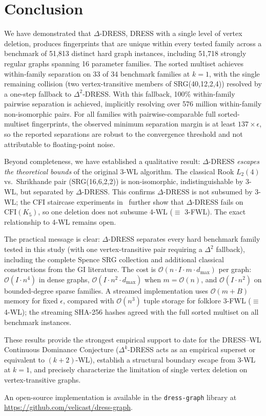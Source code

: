\documentclass[11pt,a4paper]{article}
\begin{document}
\section{Conclusion}

We have demonstrated that $\Delta$-DRESS, DRESS with a single level of vertex deletion, produces fingerprints that are unique within every tested family across a benchmark of 51{,}813 distinct hard graph instances, including 51{,}718 strongly regular graphs spanning 16 parameter families.
The sorted multiset achieves within-family separation on 33 of 34 benchmark families at $k = 1$, with the single remaining collision (two vertex-transitive members of SRG(40,12,2,4)) resolved by a one-step fallback to $\Delta^2$-DRESS.
With this fallback, 100\% within-family pairwise separation is achieved, implicitly resolving over 576 million within-family non-isomorphic pairs.
For all families with pairwise-comparable full sorted-multiset fingerprints, the observed minimum separation margin is at least $137 \times \epsilon$, so the reported separations are robust to the convergence threshold and not attributable to floating-point noise.

Beyond completeness, we have established a qualitative result: $\Delta$-DRESS \emph{escapes the theoretical bounds} of the original 3-WL algorithm.
The classical Rook $L_2(4)$ vs.\ Shrikhande pair (SRG(16,6,2,2)) is non-isomorphic, indistinguishable by 3-WL, but separated by $\Delta$-DRESS.
This confirms $\Delta$-DRESS is not subsumed by 3-WL; the CFI staircase experiments in~\cite{castrillo2026dress} further show that $\Delta$-DRESS fails on $\text{CFI}(K_5)$, so one deletion does not subsume 4-WL ($\equiv$ 3-FWL).  The exact relationship to 4-WL remains open.

The practical message is clear: $\Delta$-DRESS separates every hard benchmark family tested in this study (with one vertex-transitive pair requiring a $\Delta^2$ fallback), including the complete Spence SRG collection and additional classical constructions from the GI literature.
The cost is $\mathcal{O}(n \cdot I \cdot m \cdot d_{\max})$ per graph: $\mathcal{O}(I \cdot n^4)$ in dense graphs, $\mathcal{O}(I \cdot n^2 \cdot d_{\max})$ when $m = \mathcal{O}(n)$, and $\mathcal{O}(I \cdot n^2)$ on bounded-degree sparse families.  A streamed implementation uses $\mathcal{O}(m + B)$ memory for fixed $\epsilon$, compared with $\mathcal{O}(n^3)$ tuple storage for folklore 3-FWL ($\equiv$ 4-WL); the streaming SHA-256 hashes agreed with the full sorted multiset on all benchmark instances.

These results provide the strongest empirical support to date for the DRESS--WL Continuous Dominance Conjecture ($\Delta^k$-DRESS acts as an empirical superset or equivalent to $(k{+}2)$-WL), establish a structural boundary escape from 3-WL at $k = 1$, and precisely characterize the limitation of single vertex deletion on vertex-transitive graphs.

An open-source implementation is available in the \texttt{dress-graph} library at \url{https://github.com/velicast/dress-graph}.



\end{document}
